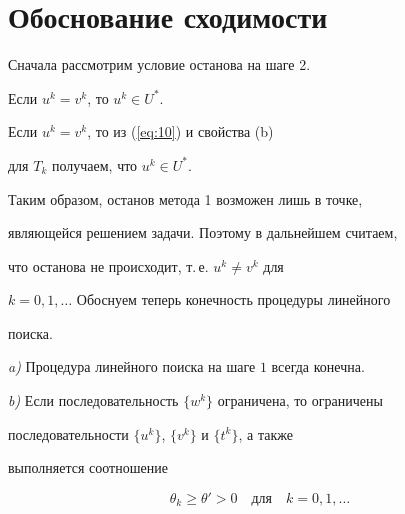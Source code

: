 \section{Обоснование сходимости}





Сначала рассмотрим условие останова на шаге 2.





\begin{lem} \label{lm:2}


Если $u^{k}=v^{k} $, то $u^{k} \in U^{*}$.


\end{lem}





\begin{pf}


Если $u^{k}=v^{k} $, то из (\ref{eq:10}) и свойства (b) 


для $T_{k}$ получаем, что $u^{k} \in U^{*}$.


\end{pf}





Таким образом, останов метода 1 возможен лишь в точке, 


являющейся решением задачи. Поэтому в дальнейшем считаем, 


что останова не происходит, т.\,е. $u^{k} \neq v^{k} $ для 


$k=0,1,\dotsc$ Обоснуем теперь конечность процедуры линейного 


поиска.


 


\begin{lem} \label{lm:3}


{\em a)} Процедура линейного поиска на шаге $1$ всегда конечна.





{\em b)} Если последовательность $\{ w^{k} \}$ ограничена, то ограничены 


последовательности $\{ u^{k} \}$, $\{ v^{k} \}$ и $\{ t^{k} \}$, а также 


выполняется соотношение


\begin{equation} \label{eq:13} 


\theta_{k} \geq \theta' > 0 \quad \text{для} \quad k=0,1,\dotsc 


\end{equation}


\end{lem}





